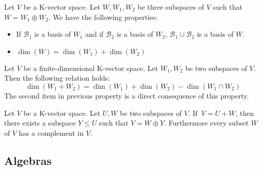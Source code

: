         \begin{theorem}
			\label{linalgebra:theorem:direct_sum}
            Let $V$ be a K-vector space. Let $W, W_1, W_2$ be three subspaces of $V$ such that $W=W_1\oplus W_2$. We have the following properties:
            \begin{itemize}
				\item If $\mathcal{B}_1$ is a basis of $W_1$ and if $\mathcal{B}_2$ is a basis of $W_2$, $\mathcal{B}_1\cup\mathcal{B}_2$ is a basis of $W$.
                \item $\dim(W) = \dim(W_1) + \dim(W_2)$
			\end{itemize}
		\end{theorem}
        \begin{theorem}
			\label{linalgebra:theorem:sum}
            Let $V$ be a finite-dimensional K-vector space. Let $W_1, W_2$ be two subspaces of $V$. Then the following relation holds:
            \begin{equation}
				\dim(W_1 + W_2) = \dim(W_1) + \dim(W_2) - \dim(W_1\cap W_2)
			\end{equation}
            The second item in previous property is a direct consequence of this property.
		\end{theorem}

        \begin{theorem}
			\label{linalgebra:theorem:complement}
            Let $V$ be a K-vector space. Let $U,W$ be two subspaces of $V$. If $\ V = U+W$, then there exists a subspace $Y\leq U$ such that $V = W\oplus Y$. Furthermore every subset $W$ of $V$ has a complement in $V$.
		\end{theorem}

    
\subsection{Algebras}

